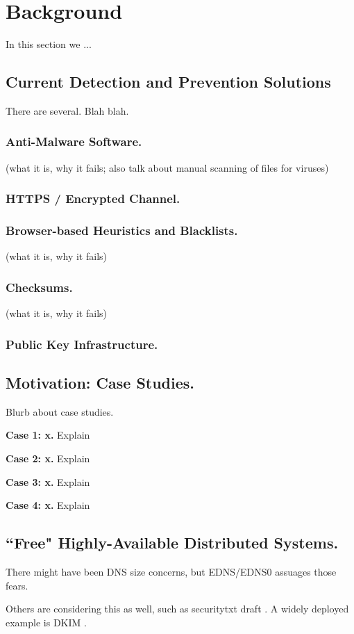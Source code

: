 \section{Background} \label{sec:background}

In this section we ...


\subsection{Current Detection and Prevention Solutions}

There are several. Blah blah.

\subsubsection{Anti-Malware Software.}    (what it is, why it fails; also talk
about manual scanning of files for viruses)

\subsubsection{HTTPS / Encrypted Channel.}    \cite{HTTP, HTTPS, TLS1, TLS2, DTLS}

\subsubsection{Browser-based Heuristics and Blacklists.}    (what it is, why it
fails)

\subsubsection{Checksums.}    (what it is, why it fails)

\subsubsection{Public Key Infrastructure.}    \cite{DANE1, DANE2, DANE3, OpenPGP1}

\subsection{Motivation: Case Studies.}

Blurb about case studies.

\textbf{Case 1: x.}    Explain

\textbf{Case 2: x.}    Explain

\textbf{Case 3: x.}    Explain

\textbf{Case 4: x.}    Explain

\subsection{``Free" Highly-Available Distributed Systems.}

There might have been DNS size concerns, but EDNS/EDNS0 \cite{EDNS} assuages
those fears.

Others are considering this as well, such as securitytxt draft
\cite{draft-sectxt}. A widely deployed example is DKIM \cite{DKIM}.
